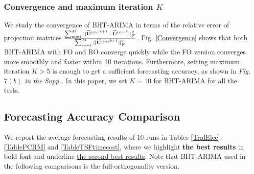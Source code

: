 \documentclass[letterpaper]{article} %
\numberwithin{theorem}{section}
\begin{document}
\subsubsection {Convergence and  maximum iteration $K$}
We study the convergence of BHT-ARIMA
in terms of the relative error  of projection matrices $ \scriptsize \frac{ \sum_{m=1}^{M} ||\widehat{ \mathbf U}{^{(m)}}^{k+1}  -\widehat{ \mathbf U}{^{(m)}}^{k} ||_F^2} {\sum_{m=1}^{M}||\widehat{ \mathbf U}{^{(m)}}^{k+1}||_F^2 }$. 
Fig. \ref{Convergence}  shows that both  BHT-ARIMA     with  FO  and RO converge  quickly  while  the FO version  converges more smoothly and faster within 10 iterations. 
Furthermore, setting maximum iteration  $K>5$ is enough to get a sufficient forecasting accuracy, as shown   in \textit{Fig. $7(b)$ in the Supp..}
In this paper, we set $K=10$  for  BHT-ARIMA for all the tests.







\subsection{Forecasting Accuracy Comparison} 

We report the  average forecasting results of 10 runs in Tables \ref{TrafElec}, \ref{TablePCRM} and  \ref{TableTSFtimecost},  where we highlight \textbf{the best results} in bold font and underline \underline{the second best results}. Note that BHT-ARIMA used in the following comparisons is the full-orthogonality version. 
\end{document}
